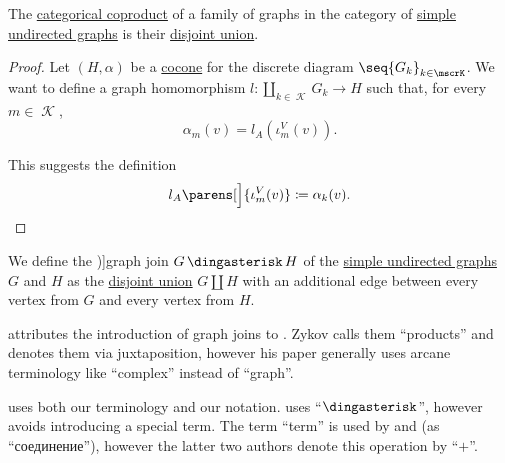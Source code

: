 \begin{proposition}\label{thm:undirected_graph_coproduct}
  The \hyperref[def:discrete_category_limits]{categorical coproduct} of a family of graphs in the category of \hyperref[def:undirected_graph]{simple undirected graphs} is their \hyperref[def:graph_disjoint_union]{disjoint union}.
\end{proposition}
\begin{proof}
  Let \( (H, \alpha) \) be a \hyperref[def:category_of_cones/cocone]{cocone} for the discrete diagram \( \seq{ G_k }_{k \in \mscrK} \). We want to define a graph homomorphism \( l: \coprod_{k \in \mscrK} G_k \to H \) such that, for every \( m \in \mscrK \),
  \begin{equation*}
    \alpha_m(v) = l_A(\iota^V_m(v)).
  \end{equation*}

  This suggests the definition
  \begin{equation*}
    l_A\parens[\Big]{ \iota^V_m(v) } \coloneqq \alpha_k(v).
  \end{equation*}
\end{proof}

\begin{definition}\label{def:graph_join}
  We define the \term[ru=соединение (графов) (\cite[265]{Новиков2013ДискретнаяМатематика})]{graph join} \( G \Ast H \) of the \hyperref[def:undirected_graph]{simple undirected graphs} \( G \) and \( H \) as the \hyperref[def:graph_disjoint_union]{disjoint union} \( G \coprod H \) with an additional edge between every vertex from \( G \) and every vertex from \( H \).
\end{definition}
\begin{comments}
  \item {} attributes the introduction of graph joins to \cite[164]{Зыков1949СоединенияГрафов}. Zykov calls them \enquote{products} and denotes them via juxtaposition, however his paper generally uses arcane terminology like \enquote{complex} instead of \enquote{graph}.

   uses both our terminology and our notation.  uses \enquote{\( \Ast \)}, however avoids introducing a special term. The term \enquote{term} is used by  and  (as \enquote{соединение}), however the latter two authors denote this operation by \enquote{\( + \)}.
\end{comments}

